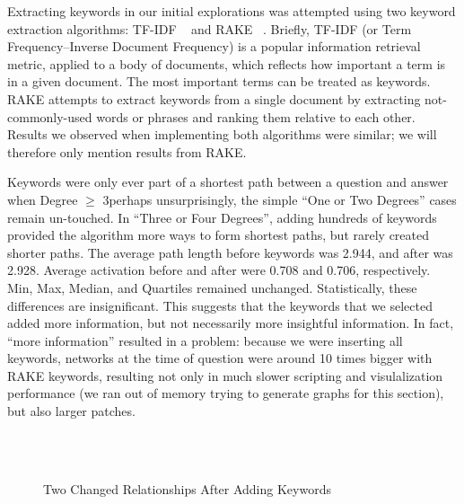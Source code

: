 Extracting keywords in our initial explorations was attempted using two keyword extraction algorithms: TF-IDF ~\cite{tfidf} and RAKE ~\cite{rake}. Briefly, TF-IDF (or Term Frequency--Inverse Document Frequency) is a popular information retrieval metric, applied to a body of documents, which reflects how important a term is in a given document. The most important terms can be treated as keywords. RAKE attempts to extract keywords from a single document by extracting not-commonly-used words or phrases and ranking them relative to each other. Results we observed when implementing both algorithms were similar; we will therefore only mention results from RAKE.

Keywords were only ever part of a shortest path between a question and answer when Degree $\geq$ 3\textemdash perhaps unsurprisingly, the simple ``One or Two Degrees'' cases remain un-touched. In ``Three or Four Degrees'', adding hundreds of keywords provided the algorithm more ways to form shortest paths, but rarely created shorter paths. The average path length before keywords was 2.944, and after was 2.928. Average activation before and after were 0.708 and 0.706, respectively. Min, Max, Median, and Quartiles remained unchanged. Statistically, these differences are insignificant. This suggests that the keywords that we selected added more information, but not necessarily more insightful information. In fact, ``more information'' resulted in a problem: because we were inserting all keywords, networks at the time of question were around 10 times bigger with RAKE keywords, resulting not only in much slower scripting and visulalization performance (we ran out of memory trying to generate graphs for this section), but also larger patches.

\begin{figure}
	\\\\
	\caption{Two Changed Relationships After Adding Keywords}
	\label{fig:keywords}
\end{figure}

